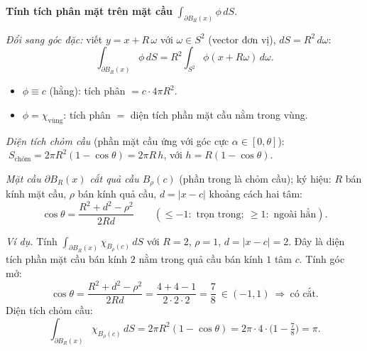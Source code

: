 \textbf{Tính tích phân mặt trên mặt cầu} $\displaystyle\int_{\partial B_R(x)}\phi\,dS$.

\emph{Đổi sang góc đặc:} viết $y=x+R\,\omega$ với $\omega\in S^2$ (vector đơn vị), $dS=R^2\,d\omega$:
\[
  \int_{\partial B_R(x)}\phi\,dS = R^2\!\int_{S^2}\phi(x+R\omega)\,d\omega .
\]
\begin{itemize}
  \item $\phi\equiv c$ (hằng): tích phân $=c\cdot 4\pi R^2$.
  \item $\phi=\chi_{\text{vùng}}$: tích phân $=$ diện tích phần mặt cầu nằm trong vùng.
\end{itemize}

\emph{Diện tích chỏm cầu} (phần mặt cầu ứng với góc cực $\alpha\in[0,\theta]$):
$\;S_{\text{chỏm}}=2\pi R^2(1-\cos\theta)=2\pi R\,h$, với $h=R(1-\cos\theta)$.

\emph{Mặt cầu $\partial B_R(x)$ cắt quả cầu $B_\rho(c)$} (phần trong là chỏm cầu); ký hiệu:
$R$ bán kính mặt cầu, $\rho$ bán kính quả cầu, $d=|x-c|$ khoảng cách hai tâm:
\[
  \cos\theta=\frac{R^2+d^2-\rho^2}{2Rd}
  \qquad(\le-1:\text{ trọn trong};\ \ge 1:\text{ ngoài hẳn}).
\]

\smallskip
\emph{Ví dụ.} Tính $\displaystyle\int_{\partial B_R(x)}\chi_{B_\rho(c)}\,dS$ với $R=2$, $\rho=1$, $d=|x-c|=2$.
Đây là diện tích phần mặt cầu bán kính $2$ nằm trong quả cầu bán kính $1$ tâm $c$. Tính góc mở:
\[
  \cos\theta=\frac{R^2+d^2-\rho^2}{2Rd}=\frac{4+4-1}{2\cdot2\cdot2}=\frac{7}{8}\ \in(-1,1)\ \Rightarrow\ \text{có cắt}.
\]
Diện tích chỏm cầu:
\[
  \int_{\partial B_R(x)}\chi_{B_\rho(c)}\,dS = 2\pi R^2(1-\cos\theta)=2\pi\cdot4\cdot\Big(1-\tfrac78\Big)=\pi.
\]
